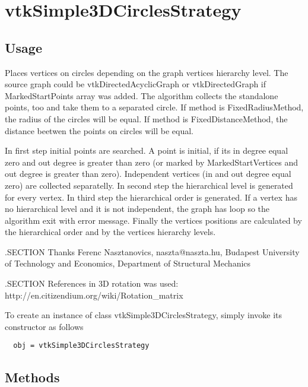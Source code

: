 \section{vtkSimple3DCirclesStrategy}

\subsection{Usage}

 Places vertices on circles depending on the graph vertices hierarchy level.
 The source graph could be vtkDirectedAcyclicGraph or vtkDirectedGraph if MarkedStartPoints array was added.
 The algorithm collects the standalone points, too and take them to a separated circle. If method is FixedRadiusMethod,
 the radius of the circles will be equal. If method is FixedDistanceMethod, the distance beetwen the points on circles will
 be equal.

 In first step initial points are searched. A point is initial, if its in degree equal zero and out degree is greater than zero (or
 marked by MarkedStartVertices and out degree is greater than zero). Independent vertices (in and out degree equal zero) are collected
 separatelly. In second step the hierarchical level is generated for every vertex. In third step the hierarchical order is generated.
 If a vertex has no hierarchical level and it is not independent, the graph has loop so the algorithm exit with error message. Finally
 the vertices positions are calculated by the hierarchical order and by the vertices hierarchy levels.

 .SECTION Thanks
 Ferenc Nasztanovics, naszta@naszta.hu, Budapest University of Technology and Economics, Department of Structural Mechanics

 .SECTION References
 in 3D rotation was used: http://en.citizendium.org/wiki/Rotation\_matrix

To create an instance of class vtkSimple3DCirclesStrategy, simply
invoke its constructor as follows
\begin{verbatim}
  obj = vtkSimple3DCirclesStrategy
\end{verbatim}
\subsection{Methods}

